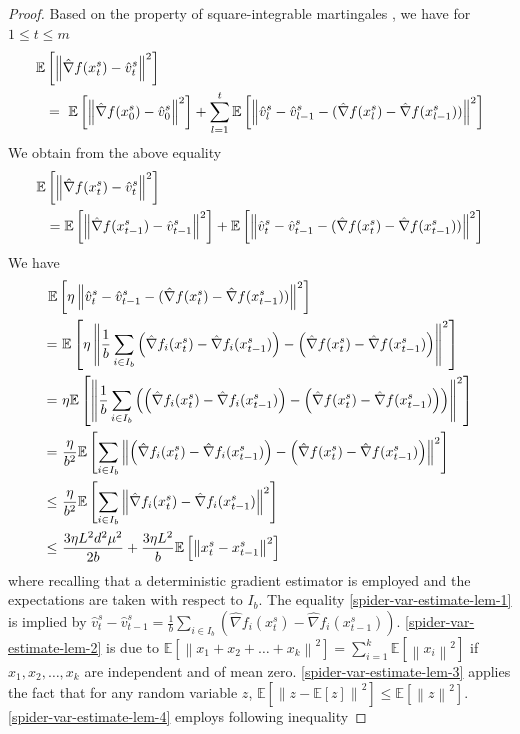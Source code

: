 \documentclass[iicol,sn-basic]{sn-jnl}
\theoremstyle{thmstyleone}%
\theoremstyle{thmstyletwo}%
\theoremstyle{thmstylethree}%
\newcommand*{\E}{\mathbb{E}}
\newcommand{\norm}[1]{\left\lVert#1\right\rVert}
\begin{document}
\begin{proof}
Based on the property of square-integrable martingales \cite{fang2018spider}, we have for $ 1 \leq t \leq m$
\begin{align}
  \E&\left[\norm{\hat{\nabla} f(x_{t}^s)-{\hat{v}_{t}^s}}^2\right]\notag\\
  & = \,\,\label{spider-var-estimate-lem-0}\E\left[\norm{\hat{\nabla} f(x_{0}^s)-{\hat{v}_{0}^s}}^2\right] + \sum_{l = 1 }^{t}\E\left[\norm{\hat{v}_{l}^s-{\hat{v}_{l-1}^s} - (\hat{\nabla} f(x_{l}^s) - \hat{\nabla} f(x_{l-1}^s))}^2\right]
\end{align}
We obtain from the above equality
\begin{align}
  \E&\left[\norm{\hat{\nabla} f(x_{t}^s)-{\hat{v}_{t}^s}}^2\right]\notag\\
  & = \notag\E\left[\norm{\hat{\nabla} f(x_{t-1}^s)-{\hat{v}_{t-1}^s}}^2\right] + \E\left[\norm{\hat{v}_{t}^s-{\hat{v}_{t-1}^s} - (\hat{\nabla} f(x_{t}^s) - \hat{\nabla} f(x_{t-1}^s))}^2\right] 
\end{align}
We have
\begin{align}
\E&\left[\eta\norm{\hat{v}_{t}^s-{\hat{v}_{t-1}^s} - (\hat{\nabla} f(x_{t}^s) - \hat{\nabla} f(x_{t-1}^s))}^2\right]\notag\\
   =&\,\,\label{spider-var-estimate-lem-1}\E\left[\eta\norm{\frac{1}{b}\sum_{i\in I_b}\left(\hat{\nabla} f_i(x_{t}^s)-\hat{\nabla} f_i({x}_{t-1}^{s})\right) - \left(\hat{\nabla} f(x_{t}^s) - \hat{\nabla} f(x_{t-1}^s)\right)}^2\right]\\
   =&\,\,\eta\E\left[\norm{\frac{1}{b}\sum_{i\in I_b}\left(\left(\hat{\nabla} f_i(x_{t}^s)-{\hat{\nabla}} f_i({x}_{t-1}^{s})\right) - \left(\hat{\nabla} f(x_{t}^s) - \hat{\nabla} f({x}_{t-1}^{s}) \right)\right)}^2\right]\notag\\
    =&\,\, \label{spider-var-estimate-lem-2}\frac{\eta}{b^2}\E\left[\sum_{i\in I_b}\norm{\left(\hat{\nabla} f_i(x_{t}^s)-\hat{\nabla} f_i({x}_{t-1}^{s})\right) - \left(\hat{\nabla} f(x_{t}^s) - \hat{\nabla} f({x}_{t-1}^{s})\right)}^2\right]\\
   \leq &\,\,\label{spider-var-estimate-lem-3}\frac{\eta}{b^2}\E\left[\sum_{i\in I_b}\norm{\hat{\nabla} f_i(x_{t}^s)-\hat{\nabla} f_i({x}_{t-1}^{s}) }^2\right]\\
   \leq & \,\,\label{spider-var-estimate-lem-4}\frac{3 \eta L^2 d^2 \mu^2}{2b} + \frac{3\eta L^2}{b}\E\left[\norm{x_{t}^s-{x}_{t-1}^{s}}^2\right]
 \end{align}
 where recalling that a deterministic gradient estimator is employed and the expectations are taken with respect to $I_b$. The equality \eqref{spider-var-estimate-lem-1} is implied by $\hat{v}_{t}^s  - \hat{v}_{t-1}^s = \frac{1}{b} \sum_{i\in I_b}\left(\hat{\nabla} f_{i}(x_{t}^s)-\hat{\nabla} f_{i}({x}_{t-1}^s)\right)$. \eqref{spider-var-estimate-lem-2} is due to $\E[\norm{x_1+x_2+\ldots+x_k}^2] = \sum_{i=1}^k \E[\norm{x_i}^2]$ if $x_1,x_2,\ldots,x_k$ are independent and of mean zero. \eqref{spider-var-estimate-lem-3} applies the fact that for any random variable $z$, $\E[\norm{z-\E[z]}^2] \leq \E[\norm{z}^2]$. \eqref{spider-var-estimate-lem-4} employs following inequality  

\end{proof}
\end{document}
